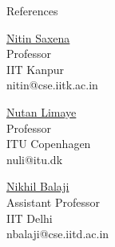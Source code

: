 \documentclass{resume} %
\begin{document}



\begin{rSection}{References}
  
  \begin{minipage}[t]{0.31\linewidth}
    \begin{flushleft}
      \href{https://cse.iitk.ac.in/users/nitin/}{Nitin Saxena} \\
      Professor \\
      IIT Kanpur\\
      nitin@cse.iitk.ac.in
    \end{flushleft}
  \end{minipage}\hfill%
  \begin{minipage}[t]{0.31\linewidth}
    \begin{center}
      \href{https://www.itu.dk/~nuli/}{Nutan Limaye} \\
      Professor \\
      ITU Copenhagen\\
      nuli@itu.dk
    \end{center}
  \end{minipage}\hfill%
  \begin{minipage}[t]{0.31\linewidth}
    \begin{flushright}
      \href{https://sites.google.com/view/nikhilbalaji/home}{Nikhil Balaji} \\
      Assistant Professor\\
      IIT Delhi\\
      nbalaji@cse.iitd.ac.in
    \end{flushright}
  \end{minipage}
\end{rSection}
\end{document}
